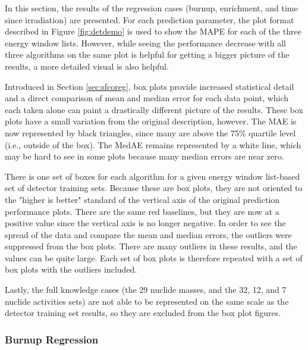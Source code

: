 
In this section, the results of the regression cases (burnup, enrichment, and
time since irradiation) are presented. For each prediction parameter, the plot
format described in Figure \ref{fig:detdemo} is used to show the \gls{MAPE} for
each of the three energy window lists.  However, while seeing the performance
decrease with all three algorithms on the same plot is helpful for getting a
bigger picture of the results, a more detailed visual is also helpful. 

Introduced in Section \ref{sec:sfcoreg}, box plots provide increased
statistical detail and a direct comparison of mean and median error for each
data point, which each taken alone can paint a drastically different picture of
the results. These box plots have a small variation from the original
description, however.  The \gls{MAE} is now represented by black triangles,
since many are above the 75\% quartile level (i.e., outside of the box).  The
\gls{MedAE} remains represented by a white line, which may be hard to see in
some plots because many median errors are near zero.

There is one set of boxes for each algorithm for a given energy window
list-based set of detector training sets.  Because these are box plots, they
are not oriented to the "higher is better" standard of the vertical axis of
the original prediction performance plots.  There are the same red baselines,
but they are now at a positive value since the vertical axis is no longer
negative. In order to see the spread of the data and compare the mean and
median errors, the outliers were suppressed from the box plots. There are many
outliers in these results, and the values can be quite large. Each set of box
plots is therefore repeated with a set of box plots with the outliers included.

Lastly, the full knowledge cases (the 29 nuclide masses, and the 32, 12, and 7
nuclide activities sets) are not able to be represented on the same scale as
the detector training set results, so they are excluded from the box plot
figures. 

\subsubsection{Burnup Regression}

